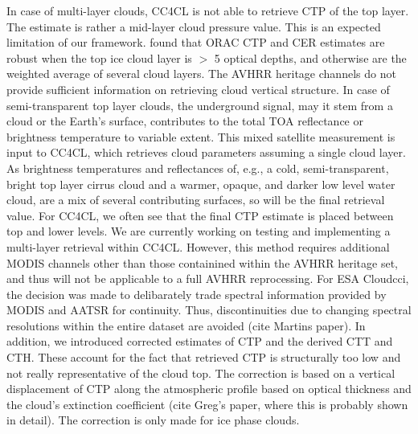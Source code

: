 In case of multi-layer clouds, CC4CL is not able to retrieve CTP of the top layer. The estimate is rather a mid-layer cloud pressure value. This is an expected limitation of our framework. \citet{Poulsen12} found that ORAC CTP and CER estimates are robust when the top ice cloud layer is $>$ 5 optical depths, and otherwise are the weighted average of several cloud layers. The AVHRR heritage channels do not provide sufficient information on retrieving cloud vertical structure. In case of semi-transparent top layer clouds, the underground signal, may it stem from a cloud or the Earth's surface, contributes to the total TOA reflectance or brightness temperature to variable extent. This mixed satellite measurement is input to CC4CL, which retrieves cloud parameters assuming a single cloud layer. As brightness temperatures and reflectances of, e.g., a cold, semi-transparent, bright top layer cirrus cloud and a warmer, opaque, and darker low level water cloud, are a mix of several contributing surfaces, so will be the final retrieval value. For CC4CL, we often see that the final CTP estimate is placed between top and lower levels. We are currently working on testing and implementing a multi-layer retrieval within CC4CL. However, this method requires additional MODIS channels other than those containined within the AVHRR heritage set, and thus will not be applicable to a full AVHRR reprocessing. For ESA Cloud\textunderscore cci, the decision was made to delibarately trade spectral information provided by MODIS and AATSR for continuity. Thus, discontinuities due to changing spectral resolutions within the entire dataset are avoided (cite Martins paper). In addition, we introduced corrected estimates of CTP and the derived CTT and CTH. These account for the fact that retrieved CTP is structurally too low and not really representative of the cloud top. The correction is based on a vertical displacement of CTP along the atmospheric profile based on optical thickness and the cloud's extinction coefficient (cite Greg's paper, where this is probably shown in detail). The correction is only made for ice phase clouds.

